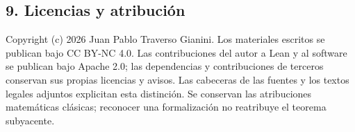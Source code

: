 \documentclass[spanish,11pt,a4paper]{article}
\begin{document}
\subsection{9. Licencias y atribución}\label{licencias-y-atribuciuxf3n}

Copyright (c) 2026 Juan Pablo Traverso Gianini. Los materiales escritos
se publican bajo CC BY-NC 4.0. Las contribuciones del autor a Lean y al
software se publican bajo Apache 2.0; las dependencias y contribuciones
de terceros conservan sus propias licencias y avisos. Las cabeceras de
las fuentes y los textos legales adjuntos explicitan esta distinción. Se
conservan las atribuciones matemáticas clásicas; reconocer una
formalización no reatribuye el teorema subyacente.
\end{document}

